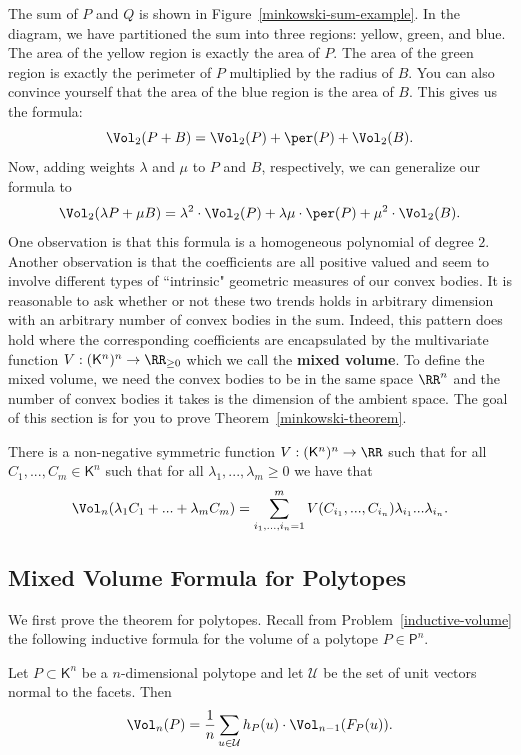 \documentclass[11pt]{article}
\begin{document}
The sum of $P$ and $Q$ is shown in Figure~\ref{minkowski-sum-example}. In the diagram, we have partitioned the sum into three regions: yellow, green, and blue. The area of the yellow region is exactly the area of $P$. The area of the green region is exactly the perimeter of $P$ multiplied by the radius of $B$. You can also convince yourself that the area of the blue region is the area of $B$. This gives us the formula:
\[
    \Vol_2(P+B) = \Vol_2(P) + \per(P) + \Vol_2(B).
\]
Now, adding weights $\lambda$ and $\mu$ to $P$ and $B$, respectively, we can generalize our formula to  
\[
    \Vol_2( \lambda P + \mu B) = \lambda^2 \cdot \Vol_2(P) + \lambda \mu \cdot \per (P) + \mu^2 \cdot \Vol_2(B).
\]
One observation is that this formula is a homogeneous polynomial of degree $2$. Another observation is that the coefficients are all positive valued and seem to involve different types of ``intrinsic" geometric measures of our convex bodies. It is reasonable to ask whether or not these two trends holds in arbitrary dimension with an arbitrary number of convex bodies in the sum. Indeed, this pattern does hold where the corresponding coefficients are encapsulated by the multivariate function $V : (\mathsf{K}^n)^n \to \RR_{\geq 0}$ which we call the \textbf{mixed volume}. To define the mixed volume, we need the convex bodies to be in the same space $\RR^n$ and the number of convex bodies it takes is the dimension of the ambient space. The goal of this section is for you to prove Theorem~\ref{minkowski-theorem}. 
\begin{thm}\label{minkowski-theorem}
    There is a non-negative symmetric function $V : (\mathsf{K}^n)^n \to \RR$ such that for all $C_1, ..., C_m \in \mathsf{K}^n$ such that for all $\lambda_1, ..., \lambda_m \geq 0$ we have that
    \[
        \Vol_n(\lambda_1 C_1 + ... + \lambda_m C_m) = \sum_{i_1, ..., i_n = 1}^m V(C_{i_1}, ..., C_{i_n}) \lambda_{i_1} ... \lambda_{i_n}. 
    \]
\end{thm}

\subsection{Mixed Volume Formula for Polytopes}

We first prove the theorem for polytopes. Recall from Problem~\ref{inductive-volume} the following inductive formula for the volume of a polytope $P \in \mathsf{P}^n$.  
\begin{prop}
    Let $P \subset \mathsf{K}^n$ be a $n$-dimensional polytope and let $\mathcal{U}$ be the set of unit vectors normal to the facets. Then
    \[
        \Vol_n(P) = \frac{1}{n} \sum_{u \in \mathcal{U}} h_P(u) \cdot \Vol_{n-1} (F_P(u)).
    \]
\end{prop}
\end{document}
